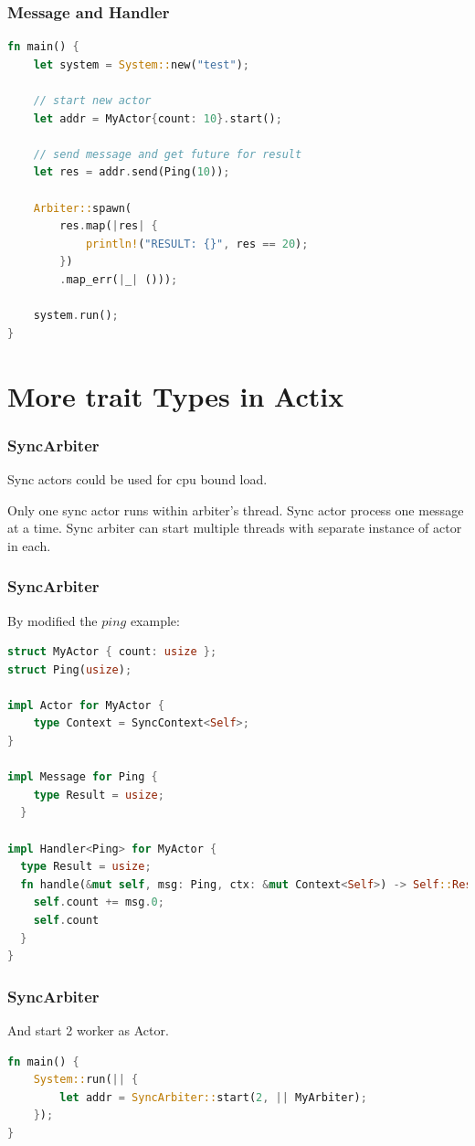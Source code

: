 \documentclass[notheorems, aspectratio=54]{beamer}
\begin{document}
\begin{frame}[fragile]

  \frametitle{Message and Handler}
  \begin{lstlisting}[language=Rust]
fn main() {
    let system = System::new("test");

    // start new actor
    let addr = MyActor{count: 10}.start();

    // send message and get future for result
    let res = addr.send(Ping(10));

    Arbiter::spawn(
        res.map(|res| {
            println!("RESULT: {}", res == 20);
        })
        .map_err(|_| ()));

    system.run();
}
\end{lstlisting}
\end{frame}


\section{More trait Types in Actix}

\begin{frame}[fragile]
  \frametitle{SyncArbiter}
  Sync actors could be used for cpu bound load.

  Only one sync actor runs within arbiter's thread. Sync actor process one message at a time. Sync arbiter can start multiple threads with separate instance of actor in each.
\end{frame}

\begin{frame}[fragile]
  \frametitle{SyncArbiter}
  By modified the $ping$ example:
    \begin{lstlisting}[language=Rust]
struct MyActor { count: usize };
struct Ping(usize);

impl Actor for MyActor {
    type Context = SyncContext<Self>;
}

impl Message for Ping {
    type Result = usize;
  }

impl Handler<Ping> for MyActor {
  type Result = usize;
  fn handle(&mut self, msg: Ping, ctx: &mut Context<Self>) -> Self::Result {
    self.count += msg.0;
    self.count
  }
}
  \end{lstlisting}

\end{frame}

\begin{frame}[fragile]
  \frametitle{SyncArbiter}
  And start 2 worker as Actor.
  \begin{lstlisting}[language=Rust]
fn main() {
    System::run(|| {
        let addr = SyncArbiter::start(2, || MyArbiter);
    });
}
  \end{lstlisting}

\end{frame}
\end{document}
